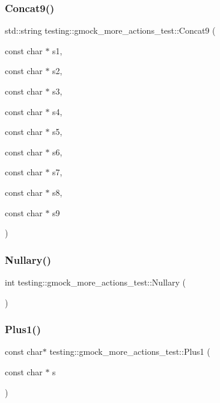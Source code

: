 \subsubsection{\texorpdfstring{Concat9()}{Concat9()}}
{\footnotesize\ttfamily std\+::string testing\+::gmock\+\_\+more\+\_\+actions\+\_\+test\+::\+Concat9 (\begin{DoxyParamCaption}\item[{const char $\ast$}]{s1,  }\item[{const char $\ast$}]{s2,  }\item[{const char $\ast$}]{s3,  }\item[{const char $\ast$}]{s4,  }\item[{const char $\ast$}]{s5,  }\item[{const char $\ast$}]{s6,  }\item[{const char $\ast$}]{s7,  }\item[{const char $\ast$}]{s8,  }\item[{const char $\ast$}]{s9 }\end{DoxyParamCaption})}

\mbox{\label{namespacetesting_1_1gmock__more__actions__test_acdd2dd80f777fdb770b513b63064ac19}} 
\subsubsection{\texorpdfstring{Nullary()}{Nullary()}}
{\footnotesize\ttfamily int testing\+::gmock\+\_\+more\+\_\+actions\+\_\+test\+::\+Nullary (\begin{DoxyParamCaption}{ }\end{DoxyParamCaption})}

\mbox{\label{namespacetesting_1_1gmock__more__actions__test_a986ada18d3311d3fa3a7c33e54e18f33}} 
\subsubsection{\texorpdfstring{Plus1()}{Plus1()}}
{\footnotesize\ttfamily const char$\ast$ testing\+::gmock\+\_\+more\+\_\+actions\+\_\+test\+::\+Plus1 (\begin{DoxyParamCaption}\item[{const char $\ast$}]{s }\end{DoxyParamCaption})}

